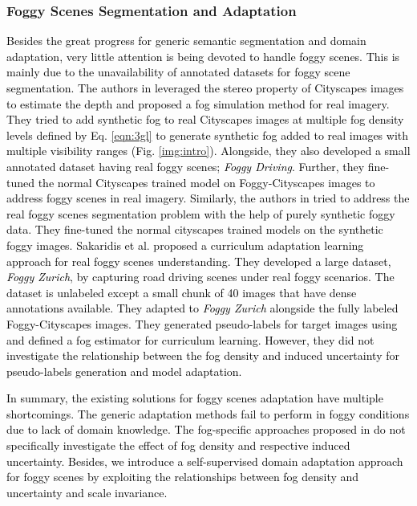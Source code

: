 \documentclass[final,5p,times,twocolumn]{elsarticle}
\begin{document}
\subsubsection{Foggy Scenes Segmentation and Adaptation}
\textcolor{black}{
Besides the great progress for generic semantic segmentation and domain adaptation, very little attention is being devoted to handle foggy scenes. This is mainly due to the unavailability of annotated datasets for foggy scene segmentation. 
The authors in \cite{sakaridis2018semantic} leveraged the stereo property of Cityscapes images to estimate the depth and proposed a fog simulation method for real imagery. They tried to add synthetic fog to real Cityscapes images at multiple fog density levels defined by Eq. \ref{eqn:3gl} to generate synthetic fog added to real images with multiple visibility ranges (Fig. \ref{img:intro}). Alongside, they also developed a small annotated dataset having real foggy scenes; \textit{Foggy Driving}.
Further, they fine-tuned the normal Cityscapes trained model on Foggy-Cityscapes images to address foggy scenes in real imagery. 
Similarly, the authors in \cite{hahner2019semantic} tried to address the real foggy scenes segmentation problem with the help of purely synthetic foggy data. They fine-tuned the normal cityscapes trained models on the synthetic foggy images. 
Sakaridis et al. \cite{sakaridis2018model, dai2019curriculum} proposed a curriculum adaptation learning approach for real foggy scenes understanding. They developed a large dataset, \textit{Foggy Zurich}, by capturing road driving scenes under real foggy scenarios. The dataset is unlabeled except a small chunk of 40 images that have dense annotations available. They adapted to \textit{Foggy Zurich} alongside the fully labeled Foggy-Cityscapes images. They generated pseudo-labels for target images using \cite{sakaridis2018semantic} and defined a fog estimator for curriculum learning.  \textcolor{black}{However, they did not investigate the relationship between the fog density and induced uncertainty for pseudo-labels generation and model adaptation.} }

\textcolor{black}{
In summary, the existing solutions for foggy scenes adaptation have multiple shortcomings. The generic adaptation methods fail to perform in foggy conditions due to lack of domain knowledge. The fog-specific approaches proposed in \cite{sakaridis2018semantic, hahner2019semantic, sakaridis2018model, dai2019curriculum} do not specifically investigate the effect of fog density and respective induced uncertainty. Besides, we introduce a self-supervised domain adaptation approach for foggy scenes by exploiting the relationships between fog density and uncertainty and scale invariance. 
}
\end{document}
